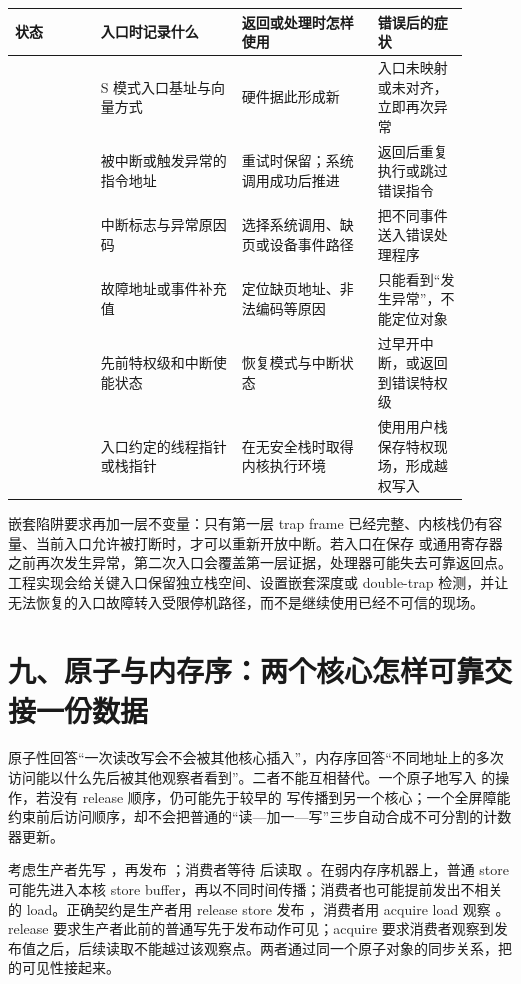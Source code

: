 \begin{longtable}{L{0.17\linewidth}L{0.28\linewidth}L{0.27\linewidth}L{0.18\linewidth}}
\toprule
状态 & 入口时记录什么 & 返回或处理时怎样使用 & 错误后的症状 \\
\midrule
{} & S 模式入口基址与向量方式 & 硬件据此形成新  & 入口未映射或未对齐，立即再次异常 \\\tablerowrule
{} & 被中断或触发异常的指令地址 & 重试时保留；系统调用成功后推进 & 返回后重复执行或跳过错误指令 \\\tablerowrule
{} & 中断标志与异常原因码 & 选择系统调用、缺页或设备事件路径 & 把不同事件送入错误处理程序 \\\tablerowrule
{} & 故障地址或事件补充值 & 定位缺页地址、非法编码等原因 & 只能看到“发生异常”，不能定位对象 \\\tablerowrule
{} & 先前特权级和中断使能状态 &  恢复模式与中断状态 & 过早开中断，或返回到错误特权级 \\\tablerowrule
{} & 入口约定的线程指针或栈指针 & 在无安全栈时取得内核执行环境 & 使用用户栈保存特权现场，形成越权写入 \\
\bottomrule
\end{longtable}

嵌套陷阱要求再加一层不变量：只有第一层 trap frame 已经完整、内核栈仍有容量、当前入口允许被打断时，才可以重新开放中断。若入口在保存  或通用寄存器之前再次发生异常，第二次入口会覆盖第一层证据，处理器可能失去可靠返回点。工程实现会给关键入口保留独立栈空间、设置嵌套深度或 double-trap 检测，并让无法恢复的入口故障转入受限停机路径，而不是继续使用已经不可信的现场。

\section{九、原子与内存序：两个核心怎样可靠交接一份数据}

原子性回答“一次读改写会不会被其他核心插入”，内存序回答“不同地址上的多次访问能以什么先后被其他观察者看到”。二者不能互相替代。一个原子地写入  的操作，若没有 release 顺序，仍可能先于较早的  写传播到另一个核心；一个全屏障能约束前后访问顺序，却不会把普通的“读—加一—写”三步自动合成不可分割的计数器更新。

考虑生产者先写 ，再发布 ；消费者等待  后读取 。在弱内存序机器上，普通 store 可能先进入本核 store buffer，再以不同时间传播；消费者也可能提前发出不相关的 load。正确契约是生产者用 release store 发布 ，消费者用 acquire load 观察 。release 要求生产者此前的普通写先于发布动作可见；acquire 要求消费者观察到发布值之后，后续读取不能越过该观察点。两者通过同一个原子对象的同步关系，把  的可见性接起来。\cite{riscv-atomics}


